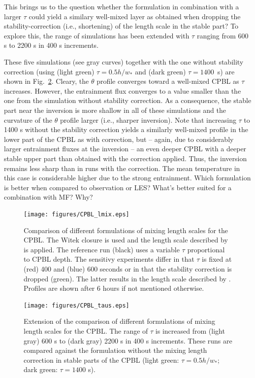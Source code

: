 \documentclass[dvipdfmx,a4paper,10pt]{article}
\begin{document}
This brings us to the question whether the \cite{suselj13} formulation in combination with a larger $\tau$ could yield a similary well-mixed layer as obtained when dropping the stability-correction (i.e., shortening) of the length scale in the stable part? To explore this, the range of simulations has been extended with $\tau$ ranging from 600 s to 2200 s in 400 s increments.

These five simulations (see gray curves) together with the one without stability correction (using (light green) $\tau=0.5h/w_*$ and (dark green) $\tau=1400$~s) are shown in Fig.~\ref{fig:taus}.  Cleary, the $\theta$ profile converges toward a well-mixed CPBL as $\tau$ increases. However, the entrainment flux converges to a value smaller than the one from the simulation without stability correction. As a consequence, the stable part near the inversion is more shallow in all of these simulations and the curvature of the $\theta$ profile larger (i.e., sharper inversion). Note that increasing $\tau$ to 1400 s without the stability correction yields a similarly well-mixed profile in the lower part of the CPBL as with correction, but -- again, due to considerably larger entrainment fluxes at the inversion -- an even deeper CPBL with a deeper stable upper part than obtained with the correction applied. Thus, the inversion remains less sharp than in runs with the correction. The mean temperature in this case is considerable higher due to the strong entrainment.  {\color{blue} Which formulation is better when compared to observation or LES? What's better suited for a combination with MF? Why?}

\begin{figure}[bthp]
\centering
 \texttt{[image: figures/CPBL\_lmix.eps]}
\caption{Comparison of different formulations of mixing length scales for the CPBL. The Witek closure is used and the length scale described by \cite{suselj13} is applied. The reference run (black) uses a variable $\tau$ proportional to CPBL depth. The sensitivy experiments differ in that $\tau$ is fixed at (red) 400 and (blue) 600 seconds or in that the stability correction is dropped (green). The latter results in the length scale described by \cite{teixeira04}. Profiles are shown after 6 hours if not mentioned otherwise.} \label{fig:lmix}
\end{figure}
\begin{figure}[bthp]
\centering
 \texttt{[image: figures/CPBL\_taus.eps]}
\caption{Extension of the comparison of different formulations of mixing length scales for the CPBL. The range of $\tau$ is increased from (light gray) 600 s to (dark gray) 2200 s in 400 s increments. These runs are compared against the formulation without the mixing length correction in stable parts of the CPBL (light green: $\tau=0.5h/w_*$; dark green: $\tau=1400$ s).} \label{fig:taus}
\end{figure}
\end{document}
